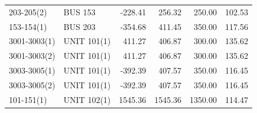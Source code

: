 \documentclass[10pt]{report}
\begin{document}
\begin{table}[H]
{\begin{tabular}{llrrrr}
203-205(2) & BUS 153 & -228.41 & 256.32 & 250.00 & 102.53 \\
153-154(1) & BUS 203 & -354.68 & 411.45 & 350.00 & 117.56 \\
3001-3003(1) & UNIT 101(1) & 411.27 & 406.87 & 300.00 & 135.62 \\
3001-3003(2) & UNIT 101(1) & 411.27 & 406.87 & 300.00 & 135.62 \\
3003-3005(1) & UNIT 101(1) & -392.39 & 407.57 & 350.00 & 116.45 \\
3003-3005(2) & UNIT 101(1) & -392.39 & 407.57 & 350.00 & 116.45 \\
101-151(1) & UNIT 102(1) & 1545.36 & 1545.36 & 1350.00 & 114.47 \\
\bottomrule
\end{tabular}}
\end{table}
\end{document}
